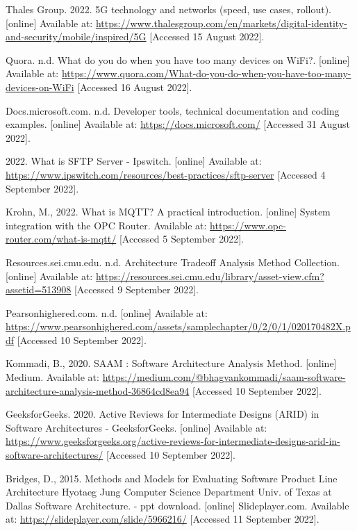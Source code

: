 \documentclass[12pt,a4paper]{article}
\begin{document}
{\begin{thebibliography}{}
Thales Group. 2022. 5G technology and networks (speed, use cases, rollout). [online] Available at: \url{https://www.thalesgroup.com/en/markets/digital-identity-and-security/mobile/inspired/5G} [Accessed 15 August 2022].


Quora. n.d. What do you do when you have too many devices on WiFi?. [online] Available at: \url{https://www.quora.com/What-do-you-do-when-you-have-too-many-devices-on-WiFi} [Accessed 16 August 2022].

Docs.microsoft.com. n.d. Developer tools, technical documentation and coding examples. [online] Available at: \url{https://docs.microsoft.com/} [Accessed 31 August 2022].

2022. What is SFTP Server - Ipswitch. [online] Available at: \url{https://www.ipswitch.com/resources/best-practices/sftp-server} [Accessed 4 September 2022].


Krohn, M., 2022. What is MQTT? A practical introduction. [online] System integration with the OPC Router. Available at: \url{https://www.opc-router.com/what-is-mqtt/} [Accessed 5 September 2022].

Resources.sei.cmu.edu. n.d. Architecture Tradeoff Analysis Method Collection. [online] Available at: \url{https://resources.sei.cmu.edu/library/asset-view.cfm?assetid=513908} [Accessed 9 September 2022].

Pearsonhighered.com. n.d. [online] Available at: \url{https://www.pearsonhighered.com/assets/samplechapter/0/2/0/1/020170482X.pdf} [Accessed 10 September 2022].

Kommadi, B., 2020. SAAM : Software Architecture Analysis Method. [online] Medium. Available at: \url{https://medium.com/@bhagvankommadi/saam-software-architecture-analysis-method-36864cd8ea94} [Accessed 10 September 2022].

GeeksforGeeks. 2020. Active Reviews for Intermediate Designs (ARID) in Software Architectures - GeeksforGeeks. [online] Available at: \url{https://www.geeksforgeeks.org/active-reviews-for-intermediate-designs-arid-in-software-architectures/} [Accessed 10 September 2022].

Bridges, D., 2015. Methods and Models for Evaluating Software Product Line Architecture Hyotaeg Jung Computer Science Department Univ. of Texas at Dallas Software Architecture. - ppt download. [online] Slideplayer.com. Available at: \url{https://slideplayer.com/slide/5966216/} [Accessed 11 September 2022].


\end{thebibliography}}
\end{document}
